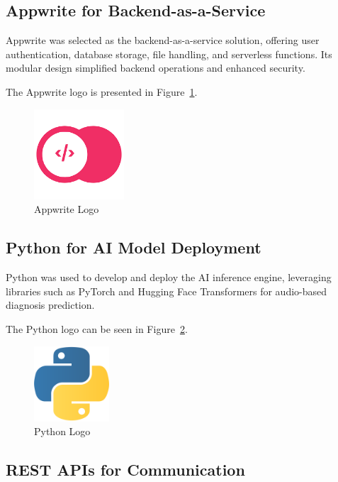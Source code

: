 \subsection{Appwrite for Backend-as-a-Service}

Appwrite was selected as the backend-as-a-service solution, offering user authentication, database storage, file handling, and serverless functions. Its modular design simplified backend operations and enhanced security.

The Appwrite logo is presented in Figure~\ref{fig:appwrite_logo}.

\begin{figure}[H]
    \centering
    \includegraphics[width=0.3\textwidth]{images/tools/appwrite.png}
    \caption{Appwrite Logo}
    \label{fig:appwrite_logo}
\end{figure}

\subsection{Python for AI Model Deployment}

Python was used to develop and deploy the AI inference engine, leveraging libraries such as PyTorch and Hugging Face Transformers for audio-based diagnosis prediction.

The Python logo can be seen in Figure~\ref{fig:python_logo}.

\begin{figure}[H]
    \centering
    \includegraphics[width=0.25\textwidth]{images/tools/python.png}
    \caption{Python Logo}
    \label{fig:python_logo}
\end{figure}

\subsection{REST APIs for Communication}

